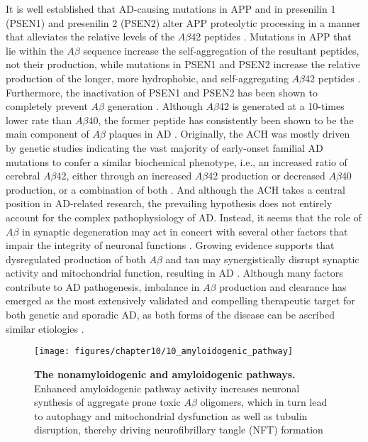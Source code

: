It is well established that AD-causing mutations in APP and in presenilin 1 (PSEN1) and presenilin 2 (PSEN2) alter APP proteolytic processing in a manner that alleviates the relative levels of the $A\beta$42 peptides \citep{Borchelt1996,Scheuner1996}. Mutations in APP that lie within the $A\beta$ sequence increase the self-aggregation of the resultant peptides, not their production, while mutations in PSEN1 and PSEN2 increase the relative production of the longer, more hydrophobic, and self-aggregating $A\beta$42 peptides \citep{Kim2008,Weggen2012}. Furthermore, the inactivation of PSEN1 and PSEN2 has been shown to completely prevent $A\beta$ generation \citep{Herreman2000,Zhang2000}. Although $A\beta$42 is generated at a 10-times lower rate than $A\beta$40, the former peptide has consistently been shown to be the main component of $A\beta$ plaques in AD \citep{Iwatsubo1994}. Originally, the ACH was mostly driven by genetic studies indicating the vast majority of early-onset familial AD mutations to confer a similar biochemical phenotype, i.e., an increased ratio of cerebral $A\beta$42, either through an increased $A\beta$42 production or decreased $A\beta$40 production, or a combination of both \citep{Cavallucci2012,Cruts1998}. And although the ACH takes a central position in AD-related research, the prevailing hypothesis does not entirely account for the complex pathophysiology of AD. Instead, it seems that the role of $A\beta$ in synaptic degeneration may act in concert with several other factors that impair the integrity of neuronal functions \citep{anand2014,DalPra2015}. Growing evidence supports that dysregulated production of both $A\beta$ and tau may synergistically disrupt synaptic activity and mitochondrial function, resulting in AD \citep{Chetelat2013,Musiek2015,Quintanilla2012,Teplow2013}. Although many factors contribute to AD pathogenesis, imbalance in $A\beta$ production and clearance has emerged as the most extensively validated and compelling therapeutic target for both genetic and sporadic AD, as both forms of the disease can be ascribed similar etiologies \citep{Selkoe2012,Selkoe2016}.

\begin{figure}[!htbp]
  \center
  \texttt{[image: figures/chapter10/10\_amyloidogenic\_pathway]}
  \caption[The nonamyloidogenic and amyloidogenic pathways.]{\textbf{The nonamyloidogenic and amyloidogenic pathways.} Enhanced amyloidogenic pathway activity increases neuronal synthesis of aggregate prone toxic $A\beta$ oligomers, which in turn lead to autophagy and mitochondrial dysfunction as well as tubulin disruption, thereby driving neurofibrillary tangle (NFT) formation}
  \label{fig:10_amyloidogenic_pathway}
\end{figure}

